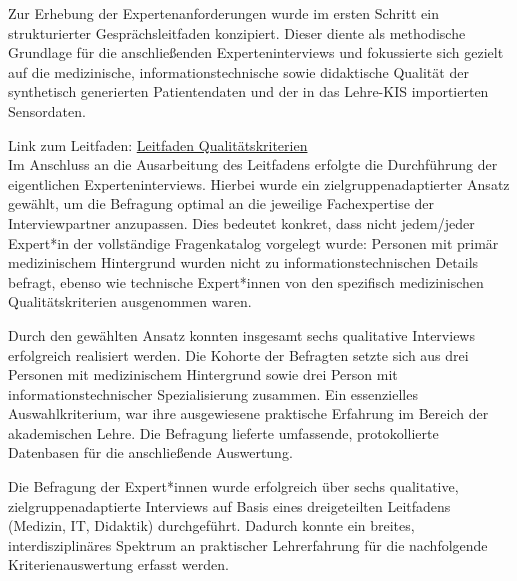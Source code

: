 \begin{description}[style=nextline, font=\bfseries]

    \item[Methodik] 
    Zur Erhebung der Expertenanforderungen wurde im ersten Schritt ein strukturierter Gesprächsleitfaden konzipiert. Dieser diente als methodische Grundlage für die anschließenden Experteninterviews und fokussierte sich gezielt auf die medizinische, informationstechnische sowie didaktische Qualität der synthetisch generierten Patientendaten und der in das Lehre-KIS importierten Sensordaten. 

    Link zum Leitfaden: 
    \href{https://github.com/robinhefner/Research-Project/blob/5359f58b92f2480c59e9677c2e41ec0f7c742b21/Gespr%C3%A4chsleitfaden_Qualit%C3%A4tskriterien.pdf}{Leitfaden Qualitätskriterien}
    \\

    \vspace{1em}
    Im Anschluss an die Ausarbeitung des Leitfadens erfolgte die Durchführung der eigentlichen Experteninterviews. Hierbei wurde ein zielgruppenadaptierter Ansatz gewählt, um die Befragung optimal an die jeweilige Fachexpertise der Interviewpartner anzupassen. Dies bedeutet konkret, dass nicht jedem/jeder Expert*in der vollständige Fragenkatalog vorgelegt wurde: Personen mit primär medizinischem Hintergrund wurden nicht zu informationstechnischen Details befragt, ebenso wie technische Expert*innen von den spezifisch medizinischen Qualitätskriterien ausgenommen waren.

    \item[Ergebnisse] 
    Durch den gewählten Ansatz konnten insgesamt sechs qualitative Interviews erfolgreich realisiert werden. Die Kohorte der Befragten setzte sich aus drei Personen mit medizinischem Hintergrund sowie drei Person mit informationstechnischer Spezialisierung zusammen. Ein essenzielles Auswahlkriterium, war ihre ausgewiesene praktische Erfahrung im Bereich der akademischen Lehre. Die Befragung lieferte umfassende, protokollierte Datenbasen für die anschließende Auswertung.

    \item[Beantwortung] 
    Die Befragung der Expert*innen wurde erfolgreich über sechs qualitative, zielgruppenadaptierte Interviews auf Basis eines dreigeteilten Leitfadens (Medizin, IT, Didaktik) durchgeführt. Dadurch konnte ein breites, interdisziplinäres Spektrum an praktischer Lehrerfahrung für die nachfolgende Kriterienauswertung erfasst werden.

\end{description}

